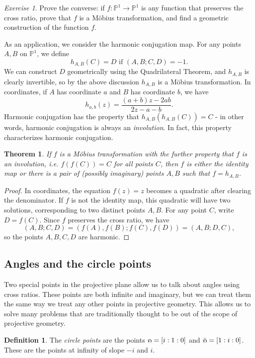 \documentclass[letterpaper,11pt]{article}
\newtheorem{thm}{Theorem}
\theoremstyle{definition}
\newtheorem{defn}{Definition}
\theoremstyle{remark}
\newtheorem{exer}{Exercise}
\begin{document}
\begin{exer} Prove the converse: if $f:\mathbb{P}^1 \rightarrow \mathbb{P}^1$ is any function that preserves the cross ratio, prove that $f$ is a M\"obius transformation, and find a geometric construction of the function $f$.
\end{exer}

As an application, we consider the harmonic conjugation map. For any points $A,B$ on $\mathbb{P}^1$, we define
\[
h_{A,B}(C) = D\mbox{ if }(A,B;C,D) = -1.
\]
We can construct $D$ geometrically using the Quadrilateral Theorem, and $h_{A,B}$ is clearly invertible, so by the above discussion $h_{A,B}$ is a M\"obius transformation. In coordinates, if $A$ has coordinate $a$ and $B$ has coordinate $b$, we have
\[
h_{a,b}(z) = \frac{(a+b)z-2ab}{2z-a-b}.
\]
Harmonic conjugation has the property that $h_{A,B}(h_{A,B}(C)) = C$ - in other words, harmonic conjugation is always an \emph{involution}. In fact, this property characterizes harmonic conjugation.

\begin{thm} If $f$ is a M\"obius transformation with the further property that $f$ is an involution, i.e. $f(f(C)) = C$ for all points $C$, then $f$ is either the identity map or there is a pair of (possibly imaginary) points $A,B$ such that $f = h_{A,B}$.
\end{thm}
\begin{proof} In coordinates, the equation $f(z) = z$ becomes a quadratic after clearing the denominator. If $f$ is not the identity map, this quadratic will have two solutions, corresponding to two distinct points $A,B$. For any point $C$, write $D = f(C)$. Since $f$ preserves the cross ratio, we have
\[
(A,B;C,D) = (f(A),f(B);f(C),f(D)) = (A,B;D,C),
\]
so the points $A,B,C,D$ are harmonic.
\end{proof}

\subsection{Angles and the circle points}

Two special points in the projective plane allow us to talk about angles using cross ratios. These points are both infinite and imaginary, but we can treat them the same way we treat any other points in projective geometry. This allows us to solve many problems that are traditionally thought to be out of the scope of projective geometry.

\begin{defn} The \emph{circle points} are the points $\fish = [i:1:0]$ and $\bar\fish = [1:i:0]$. These are the points at infinity of slope $-i$ and $i$.
\end{defn}
\end{document}
